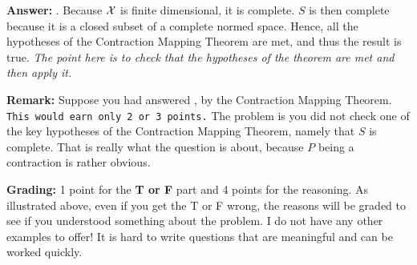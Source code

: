 \documentclass[letterpaper]{article}
\begin{document}
\begin{enumerate}
    \textbf{Answer:} .  Because ${\cal X}$ is finite dimensional, it is complete. $S$ is then complete because it is a closed subset of a complete normed space. Hence, all the hypotheses of the Contraction Mapping Theorem are met, and thus the result is true. \textit{The point here is to check that the hypotheses of the theorem are met and then apply it.}
    
  \vspace*{0.4cm}
     \textbf{Remark:} Suppose you had answered , by the Contraction Mapping Theorem. \texttt{This would earn only 2 or 3 points.} The problem is you did not check one of the key hypotheses of the Contraction Mapping Theorem, namely that $S$ is complete. That is really what the question is about, because $P$ being a contraction is rather obvious.

\end{enumerate}


\vspace*{2cm} \textbf{\large Grading:} 1 point for the \textbf{T or F} part and 4 points for the reasoning. As illustrated above, even if you get the T or F wrong, the reasons will be graded to see if you understood something about the problem. I do not have any other examples to offer! It is hard to write questions that are meaningful and can be worked quickly.
\end{document}

